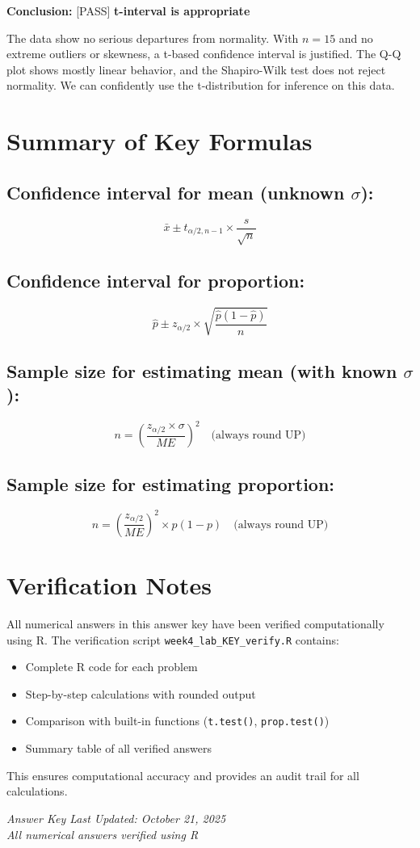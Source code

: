 \documentclass[11pt]{article}
\begin{document}
\textbf{Conclusion:} [PASS] \textbf{t-interval is appropriate}

The data show no serious departures from normality. With $n = 15$ and no extreme outliers or skewness, a t-based confidence interval is justified. The Q-Q plot shows mostly linear behavior, and the Shapiro-Wilk test does not reject normality. We can confidently use the t-distribution for inference on this data.

\vspace{24pt}

\section*{Summary of Key Formulas}

\subsection*{Confidence interval for mean (unknown $\sigma$):}
$$\bar{x} \pm t_{\alpha/2, n-1} \times \frac{s}{\sqrt{n}}$$

\subsection*{Confidence interval for proportion:}
$$\hat{p} \pm z_{\alpha/2} \times \sqrt{\frac{\hat{p}(1-\hat{p})}{n}}$$

\subsection*{Sample size for estimating mean (with known $\sigma$):}
$$n = \left(\frac{z_{\alpha/2} \times \sigma}{ME}\right)^2 \quad \text{(always round UP)}$$

\subsection*{Sample size for estimating proportion:}
$$n = \left(\frac{z_{\alpha/2}}{ME}\right)^2 \times p(1-p) \quad \text{(always round UP)}$$

\vspace{12pt}

\section*{Verification Notes}

All numerical answers in this answer key have been verified computationally using R. The verification script \texttt{week4\_lab\_KEY\_verify.R} contains:
\begin{itemize}
\item Complete R code for each problem
\item Step-by-step calculations with rounded output
\item Comparison with built-in functions (\texttt{t.test()}, \texttt{prop.test()})
\item Summary table of all verified answers
\end{itemize}

This ensures computational accuracy and provides an audit trail for all calculations.

\vspace{12pt}

\noindent\textit{Answer Key Last Updated: October 21, 2025}\\
\noindent\textit{All numerical answers verified using R}
\end{document}
